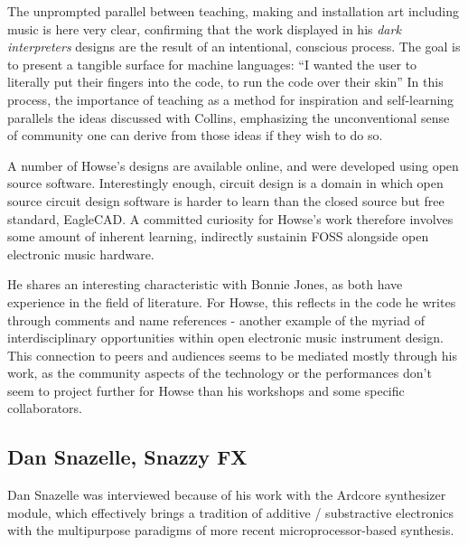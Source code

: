 The unprompted parallel between teaching, making and installation art including music is here very clear, confirming that the work displayed in his \emph{dark interpreters} designs are the result of an intentional, conscious process. The goal is to present a tangible surface for machine languages: ``I wanted the user to literally put their fingers into the code, to run the code over their skin'' In this process, the importance of teaching as a method for inspiration and self-learning parallels the ideas discussed with Collins, emphasizing the unconventional sense of community one can derive from those ideas if they wish to do so. 

A number of Howse's designs are available online, and were developed using open source software. Interestingly enough, circuit design is a domain in which open source circuit design software is harder to learn than the closed source but free standard, EagleCAD. A committed curiosity for Howse's work therefore involves some amount of inherent learning, indirectly sustainin FOSS alongside open electronic music hardware. 

He shares an interesting characteristic with Bonnie Jones, as both have experience in the field of literature. For Howse, this reflects in the code he writes through comments and name references - another example of the myriad of interdisciplinary opportunities within open electronic music instrument design. This connection to peers and audiences seems to be mediated mostly through his work, as the community aspects of the technology or the performances don't seem to project further for Howse than his workshops and some specific collaborators. 

%
\subsection{Dan Snazelle, Snazzy FX}

Dan Snazelle was interviewed because of his work with the Ardcore synthesizer module, which effectively brings a tradition of additive / substractive electronics with the multipurpose paradigms of more recent microprocessor-based synthesis. 

